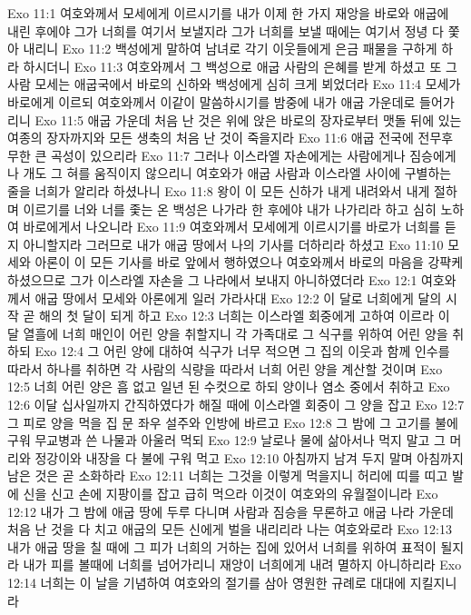 Exo 11:1  여호와께서 모세에게 이르시기를 내가 이제 한 가지 재앙을 바로와 애굽에 내린 후에야 그가 너희를 여기서 보낼지라 그가 너희를 보낼 때에는 여기서 정녕 다 쫓아 내리니
Exo 11:2  백성에게 말하여 남녀로 각기 이웃들에게 은금 패물을 구하게 하라 하시더니
Exo 11:3  여호와께서 그 백성으로 애굽 사람의 은혜를 받게 하셨고 또 그 사람 모세는 애굽국에서 바로의 신하와 백성에게 심히 크게 뵈었더라
Exo 11:4  모세가 바로에게 이르되 여호와께서 이같이 말씀하시기를 밤중에 내가 애굽 가운데로 들어가리니
Exo 11:5  애굽 가운데 처음 난 것은 위에 앉은 바로의 장자로부터 맷돌 뒤에 있는 여종의 장자까지와 모든 생축의 처음 난 것이 죽을지라
Exo 11:6  애굽 전국에 전무후무한 큰 곡성이 있으리라
Exo 11:7  그러나 이스라엘 자손에게는 사람에게나 짐승에게나 개도 그 혀를 움직이지 않으리니 여호와가 애굽 사람과 이스라엘 사이에 구별하는 줄을 너희가 알리라 하셨나니
Exo 11:8  왕이 이 모든 신하가 내게 내려와서 내게 절하며 이르기를 너와 너를 좇는 온 백성은 나가라 한 후에야 내가 나가리라 하고 심히 노하여 바로에게서 나오니라
Exo 11:9  여호와께서 모세에게 이르시기를 바로가 너희를 듣지 아니할지라 그러므로 내가 애굽 땅에서 나의 기사를 더하리라 하셨고
Exo 11:10  모세와 아론이 이 모든 기사를 바로 앞에서 행하였으나 여호와께서 바로의 마음을 강퍅케 하셨으므로 그가 이스라엘 자손을 그 나라에서 보내지 아니하였더라
Exo 12:1  여호와께서 애굽 땅에서 모세와 아론에게 일러 가라사대
Exo 12:2  이 달로 너희에게 달의 시작 곧 해의 첫 달이 되게 하고
Exo 12:3  너희는 이스라엘 회중에게 고하여 이르라 이 달 열흘에 너희 매인이 어린 양을 취할지니 각 가족대로 그 식구를 위하여 어린 양을 취하되
Exo 12:4  그 어린 양에 대하여 식구가 너무 적으면 그 집의 이웃과 함께 인수를 따라서 하나를 취하면 각 사람의 식량을 따라서 너희 어린 양을 계산할 것이며
Exo 12:5  너희 어린 양은 흠 없고 일년 된 수컷으로 하되 양이나 염소 중에서 취하고
Exo 12:6  이달 십사일까지 간직하였다가 해질 때에 이스라엘 회중이 그 양을 잡고
Exo 12:7  그 피로 양을 먹을 집 문 좌우 설주와 인방에 바르고
Exo 12:8  그 밤에 그 고기를 불에 구워 무교병과 쓴 나물과 아울러 먹되
Exo 12:9  날로나 물에 삶아서나 먹지 말고 그 머리와 정강이와 내장을 다 불에 구워 먹고
Exo 12:10  아침까지 남겨 두지 말며 아침까지 남은 것은 곧 소화하라
Exo 12:11  너희는 그것을 이렇게 먹을지니 허리에 띠를 띠고 발에 신을 신고 손에 지팡이를 잡고 급히 먹으라 이것이 여호와의 유월절이니라
Exo 12:12  내가 그 밤에 애굽 땅에 두루 다니며 사람과 짐승을 무론하고 애굽 나라 가운데 처음 난 것을 다 치고 애굽의 모든 신에게 벌을 내리리라 나는 여호와로라
Exo 12:13  내가 애굽 땅을 칠 때에 그 피가 너희의 거하는 집에 있어서 너희를 위하여 표적이 될지라 내가 피를 볼때에 너희를 넘어가리니 재앙이 너희에게 내려 멸하지 아니하리라
Exo 12:14  너희는 이 날을 기념하여 여호와의 절기를 삼아 영원한 규례로 대대에 지킬지니라
